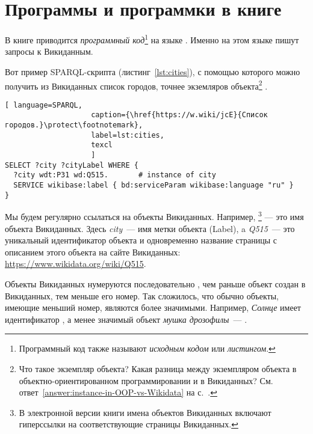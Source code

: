 





\chapter{Программы и программки в книге}
\label{ch:listing_about}

В книге приводится \emph{программный код}\footnote[][0cm]{%
    Программный код также называют  \emph{исходным кодом} или 
    \emph{листингом}.
%   
} на языке . 
Именно на этом языке пишут запросы к Викиданным.


Вот пример SPARQL-скрипта (листинг~\ref{lst:cities}), 
с помощью которого можно получить из Викиданных список городов, 
точнее экземляров объекта\footnote{\label{question:instance-in-OOP-vs-Wikidata}Что такое экземпляр объекта? 
    Какая разница между экземпляром объекта 
    в объектно-ориентированном программировании и в Викиданных?
    См. ответ~\ref{answer:instance-in-OOP-vs-Wikidata} на с.~\pageref{answer:instance-in-OOP-vs-Wikidata}.
    }
.

\begin{lstlisting}[ language=SPARQL, 
                    caption={\href{https://w.wiki/jcE}{Список городов.}\protect\footnotemark},
                    label=lst:cities,
                    texcl 
                    ]
SELECT ?city ?cityLabel WHERE { 
  ?city wdt:P31 wd:Q515.       # instance of city
  SERVICE wikibase:label { bd:serviceParam wikibase:language "ru" }
}
\end{lstlisting}%

Мы будем регулярно ссылаться на объекты Викиданных. 
Например, \footnote[][0cm]{%
%    
    В электронной версии книги имена объектов Викиданных включают гиперссылки на соответствующие страницы Викиданных.
} 
--- это имя объекта Викиданных. 
Здесь \emph{city}~--- имя метки объекта (Label), 
a \emph{Q515}~--- это уникальный идентификатор объекта 
и одновременно название страницы с описанием этого объекта на сайте Викиданных: \href{https://www.wikidata.org/wiki/Q515}{https://www.wikidata.org/wiki/Q515}.

\label{WDObjectsNumbering}
Объекты Викиданных нумеруются последовательно%
, чем раньше объект создан в Викиданных, тем меньше его номер. 
Так сложилось, что обычно объекты, имеющие меньший номер, являются более значимыми. 
Например, \emph{Солнце} имеет идентификатор , а менее значимый объект \emph{мушка дрозофилы}~--- .
